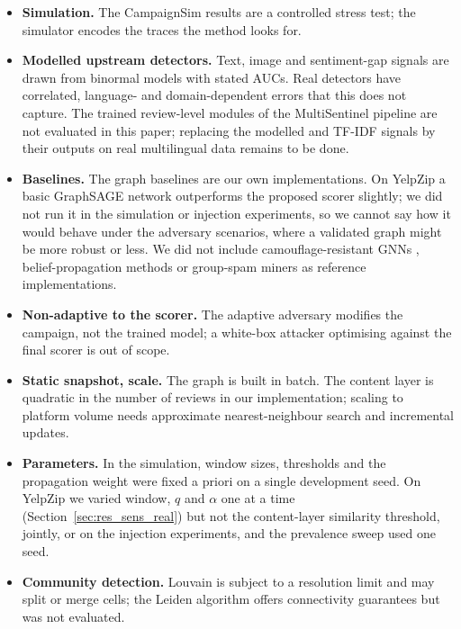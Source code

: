 \documentclass[pdflatex,sn-basic]{sn-jnl}
\theoremstyle{thmstyleone}
\theoremstyle{thmstylethree}
\begin{document}
\begin{itemize}
\item \textbf{Simulation.} The CampaignSim results are a controlled stress test; the simulator encodes the traces the method looks for.
\item \textbf{Modelled upstream detectors.} Text, image and sentiment-gap signals are drawn from binormal models with stated AUCs. Real detectors have correlated, language- and domain-dependent errors that this does not capture. The trained review-level modules of the MultiSentinel pipeline are not evaluated in this paper; replacing the modelled and TF-IDF signals by their outputs on real multilingual data remains to be done.
\item \textbf{Baselines.} The graph baselines are our own implementations. On YelpZip a basic GraphSAGE network outperforms the proposed scorer slightly; we did not run it in the simulation or injection experiments, so we cannot say how it would behave under the adversary scenarios, where a validated graph might be more robust or less. We did not include camouflage-resistant GNNs \citep[e.g.][]{dou2020}, belief-propagation methods \citep{akoglu2013} or group-spam miners \citep{mukherjee2012} as reference implementations.
\item \textbf{Non-adaptive to the scorer.} The adaptive adversary modifies the campaign, not the trained model; a white-box attacker optimising against the final scorer is out of scope.
\item \textbf{Static snapshot, scale.} The graph is built in batch. The content layer is quadratic in the number of reviews in our implementation; scaling to platform volume needs approximate nearest-neighbour search and incremental updates.
\item \textbf{Parameters.} In the simulation, window sizes, thresholds and the propagation weight were fixed a priori on a single development seed. On YelpZip we varied window, $q$ and $\alpha$ one at a time (Section~\ref{sec:res_sens_real}) but not the content-layer similarity threshold, jointly, or on the injection experiments, and the prevalence sweep used one seed.
\item \textbf{Community detection.} Louvain is subject to a resolution limit and may split or merge cells; the Leiden algorithm offers connectivity guarantees but was not evaluated.
\end{itemize}
\end{document}
